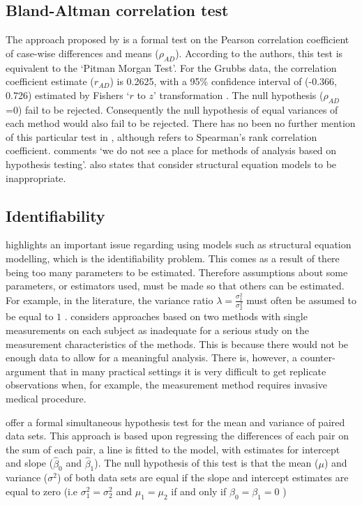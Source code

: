\documentclass[Main.tex]{subfiles}
\begin{document}
\subsection{Bland-Altman correlation test}

The approach proposed by \citet{BA83} is a formal test on the
Pearson correlation coefficient of case-wise differences and means
($\rho_{AD}$). According to the authors, this test is equivalent
to the `Pitman Morgan Test'. For the Grubbs data, the correlation
coefficient estimate ($r_{AD}$) is 0.2625, with a 95\% confidence
interval of (-0.366, 0.726) estimated by Fishers `$r$ to $z$'
transformation \citep*{Cohen}. The null hypothesis ($\rho_{AD}$ =0)
fail to be rejected. Consequently the null hypothesis of equal
variances of each method would also fail to be rejected. There has
no been no further mention of this particular test in
\citet{BA86}, although \citet{BA99} refers to Spearman's rank
correlation coefficient. \citet{BA99} comments `we do not see a
place for methods of analysis based on hypothesis testing'.
\citet{BA99} also states that consider structural equation models
to be inappropriate.

	\subsection{Identifiability}
	\citet{DunnSEME} highlights an important issue regarding using models such as structural equation modelling, which is the identifiability problem. This comes as a
	result of there being too many parameters to be estimated. Therefore assumptions about some parameters, or estimators used, must be made so that others can be estimated. For example, in the literature, the variance ratio $\lambda=\frac{\sigma^{2}_{1}}{\sigma^{2}_{2}}$
	must often be assumed to be equal to $1$ \citep{linnet98}. \citet{DunnSEME} considers approaches based on two methods with single measurements on each subject as inadequate for a serious
	study on the measurement characteristics of the methods. This is because there would not be enough data to allow for a meaningful
	analysis. There is, however, a counter-argument that in many practical settings it is very difficult to get replicate observations when, for example, the measurement method requires invasive medical
	procedure.
	
	\citet{BB89} offer a formal simultaneous hypothesis test for the mean and variance of paired data sets. This approach is based upon regressing the differences of each pair on the sum of each pair, a
	line is fitted to the model, with estimates for intercept and
	slope ($\hat{\beta}_{0}$ and $\hat{\beta}_{1}$). The null
	hypothesis of this test is that the mean ($\mu$) and variance
	($\sigma^{2}$) of both data sets are equal if the slope and
	intercept estimates are equal to zero (i.e $\sigma^{2}_{1} =
	\sigma^{2}_{2}$ and $\mu_{1}=\mu_{2}$ if and only if $\beta_{0}=
	\beta_{1}=0$ )
	
\end{document}
